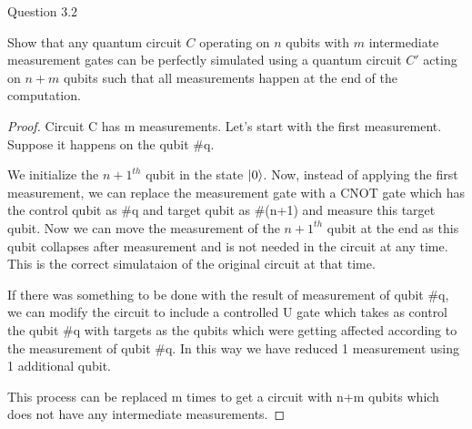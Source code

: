 \begin{solution}{Question 3.2}\label{ques:32}
    \begin{question}
    Show that any quantum circuit $C$ operating on $n$ qubits with $m$ intermediate measurement gates can be perfectly simulated using a quantum circuit $C'$ acting on $n + m$ qubits such that all measurements happen at the end of the computation.
    \end{question}
    \tcblower{}
    \begin{proof}
    Circuit C has m measurements. Let's start with the first measurement. Suppose it happens on the qubit \#q.\par
    We initialize the $n+1^{th}$ qubit in the state $\ket{0}$. Now, instead of applying the first measurement, we can replace the measurement gate with a CNOT gate which has the control qubit as \#q and target qubit as \#(n+1) and measure this target qubit. Now we can move the measurement of the $n+1^{th}$ qubit at the end as this qubit collapses after measurement and is not needed in the circuit at any time. This is the correct simulataion of the original circuit at that time.\par
    If there was something to be done with the result of measurement of qubit \#q, we can modify the circuit to include a controlled U gate which takes as control the qubit \#q with targets as the qubits which were getting affected according to the measurement of qubit \#q. In this way we have reduced 1 measurement using 1 additional qubit.\par
    This process can be replaced m times to get a circuit with n+m qubits which does not have any intermediate measurements.
    \end{proof}
\end{solution}
